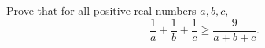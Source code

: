 Prove that for all positive real numbers $a,b,c$,
\[\dfrac1a+\dfrac1b+\dfrac1c\ge\dfrac{9}{a+b+c}.\]
